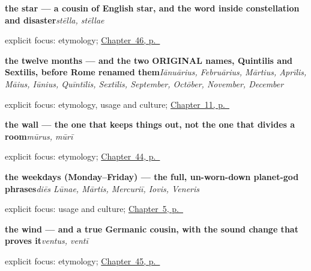 \noindent\begin{minipage}[t]{\linewidth}
\raggedright
\textbf{the star — a cousin of English star, and the word inside constellation and disaster}\enspace\emph{stēlla, stēllae}\par
\footnotesize explicit focus: etymology; \hyperref[ch:la-lux]{Chapter~46, p.~\pageref*{ch:la-lux}}
\end{minipage}\par\smallskip

\noindent\begin{minipage}[t]{\linewidth}
\raggedright
\textbf{the twelve months — and the two ORIGINAL names, Quintilis and Sextilis, before Rome renamed them}\enspace\emph{Iānuārius, Februārius, Mārtius, Aprīlis, Māius, Iūnius, Quīntīlis, Sextīlis, September, Octōber, November, December}\par
\footnotesize explicit focus: etymology, usage and culture; \hyperref[ch:la-months]{Chapter~11, p.~\pageref*{ch:la-months}}
\end{minipage}\par\smallskip

\noindent\begin{minipage}[t]{\linewidth}
\raggedright
\textbf{the wall — the one that keeps things out, not the one that divides a room}\enspace\emph{mūrus, mūrī}\par
\footnotesize explicit focus: etymology; \hyperref[ch:la-domus]{Chapter~44, p.~\pageref*{ch:la-domus}}
\end{minipage}\par\smallskip

\noindent\begin{minipage}[t]{\linewidth}
\raggedright
\textbf{the weekdays (Monday–Friday) — the full, un-worn-down planet-god phrases}\enspace\emph{diēs Lūnae, Mārtis, Mercuriī, Iovis, Veneris}\par
\footnotesize explicit focus: usage and culture; \hyperref[ch:la-days-of-the-week]{Chapter~5, p.~\pageref*{ch:la-days-of-the-week}}
\end{minipage}\par\smallskip

\noindent\begin{minipage}[t]{\linewidth}
\raggedright
\textbf{the wind — and a true Germanic cousin, with the sound change that proves it}\enspace\emph{ventus, ventī}\par
\footnotesize explicit focus: etymology; \hyperref[ch:la-mundus]{Chapter~45, p.~\pageref*{ch:la-mundus}}
\end{minipage}\par\smallskip

